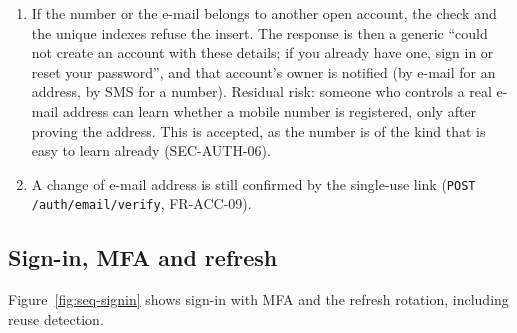 \documentclass[11pt,a4paper]{article}
\begin{document}
\begin{enumerate}[nosep]
  \begin{itemize}[nosep]
    \item the \texttt{users} row is created, with \texttt{email\_verified\_at} set (the code proved the address), and the \texttt{consents} rows with the versions and the time (FR-ACC-04, FR-PRV-01);
    \item \texttt{identity.user.registered} is written to the outbox;
    \item \texttt{account.registered} is audited.
  \end{itemize}
  The person is not signed in. An e-mail tells them the account was created and links to the sign-in page. Because the e-mail code at sign-in is on by default (FR-ACC-12) and the device is not yet remembered, the first sign-in asks for another code.
  \item If the number or the e-mail belongs to another open account, the check and the unique indexes refuse the insert. The response is then a generic ``could not create an account with these details; if you already have one, sign in or reset your password'', and that account's owner is notified (by e-mail for an address, by SMS for a number). Residual risk: someone who controls a real e-mail address can learn whether a mobile number is registered, only after proving the address. This is accepted, as the number is of the kind that is easy to learn already (SEC-AUTH-06).
  \item A change of e-mail address is still confirmed by the single-use link (\texttt{POST /auth/email/verify}, FR-ACC-09).
\end{enumerate}

\subsection{Sign-in, MFA and refresh}
\label{sec:flow-signin}
Figure~\ref{fig:seq-signin} shows sign-in with MFA and the refresh rotation, including reuse detection.
\end{document}
